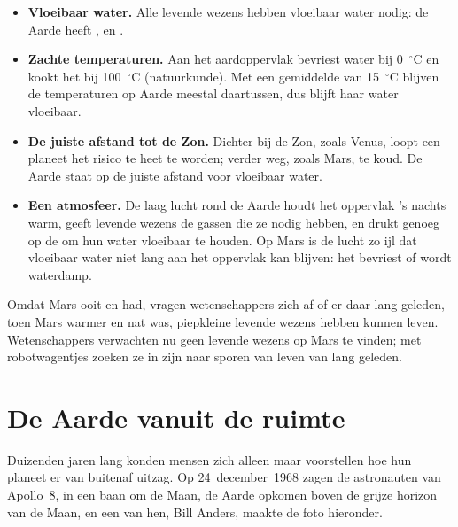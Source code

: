 \begin{itemize}
  \item \textbf{Vloeibaar water.} Alle levende wezens hebben vloeibaar water
        nodig: de Aarde heeft ,  en .
  \item \textbf{Zachte temperaturen.} Aan het aardoppervlak bevriest water
        bij 0~$^\circ$C en kookt het bij 100~$^\circ$C (natuurkunde). Met
        een gemiddelde van 15~$^\circ$C blijven de temperaturen op Aarde
        meestal daartussen, dus blijft haar water vloeibaar.
  \item \textbf{De juiste afstand tot de Zon.} Dichter bij de Zon, zoals
        Venus, loopt een planeet het risico te heet te worden; verder weg,
        zoals Mars, te koud. De Aarde staat op de juiste afstand voor
        vloeibaar water.
  \item \textbf{Een atmosfeer.} De laag lucht rond de Aarde houdt het
        oppervlak 's nachts warm, geeft levende wezens de gassen die ze
        nodig hebben, en drukt genoeg op de  om hun water vloeibaar
        te houden. Op Mars is de lucht zo ijl dat vloeibaar water niet lang
        aan het oppervlak kan blijven: het bevriest of wordt waterdamp.
\end{itemize}

\begin{remark}\label{rem:g6:earth-a-planet:mars-life}
Omdat Mars ooit  en  had, vragen wetenschappers zich af of er
daar lang geleden, toen Mars warmer en nat was, piepkleine levende wezens
hebben kunnen leven. Wetenschappers verwachten nu geen levende wezens op
Mars te vinden; met robotwagentjes zoeken ze in zijn  naar
sporen van leven van lang geleden.
\end{remark}

\section{De Aarde vanuit de ruimte}

Duizenden jaren lang konden mensen zich alleen maar voorstellen hoe hun
planeet er van buitenaf uitzag. Op 24~december~1968 zagen de astronauten
van Apollo~8, in een baan om de Maan, de Aarde opkomen boven de grijze
horizon van de Maan, en een van hen, Bill Anders, maakte de foto
hieronder.

